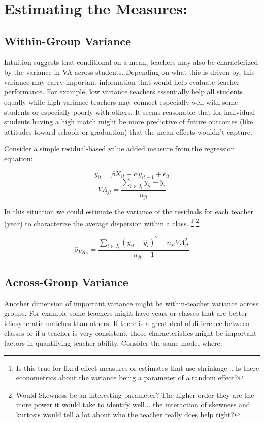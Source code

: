 \documentclass[letterpaper,12pt]{article}
\begin{document}
\section{Estimating the Measures:}

\subsection{Within-Group Variance}

Intuition suggests that conditional on a mean, teachers may also be characterized by the variance in VA across students. Depending on what this is driven by, this variance may carry important information that would help evaluate teacher performance. For example, low variance teachers essentially help all students equally while high variance teachers may connect especially well with some students or especially poorly with others. It seems reasonable that for individual students having a high match might be more predictive of future outcomes (like attitudes toward schools or graduation) that the mean effects wouldn't capture.

Consider a simple residual-based value added measure from the regression equation:

$$ y_{it} = \beta X_{it} + \alpha y_{it-1} + \epsilon_{it} $$
$$ VA_{jt} = \frac{\sum_{i\in J_t}y_{it} - \hat{y}_i}{n_{jt}}  $$

In this situation we could estimate the variance of the residuals for each teacher (year) to characterize the average dispersion within a class. 
\footnote{Is this true for fixed effect measures or estimates that use shrinkage... Is there econometrics about the variance being a parameter of a random effect?}
\footnote{Would Skewness be an interesting parameter? The higher order they are the more power it would take to identify well... the interaction of skewness and kurtosis would tell a lot about who the teacher really does help right?}


$$ \hat{\sigma}_{VA_{jt}} = \frac{\sum_{i\in J_t}(y_{it} - \hat{y}_i)^2 - n_{jt}VA_{jt}^2}{n_{jt} - 1}  $$


\subsection{Across-Group Variance}

Another dimension of important variance might be within-teacher variance across groups. For example some teachers might have years or classes that are better idiosyncratic matches than others. If there is a great deal of difference between classes or if a teacher is very consistent, those characteristics might be important factors in quantifying teacher ability. Consider the same model where:
\end{document}
